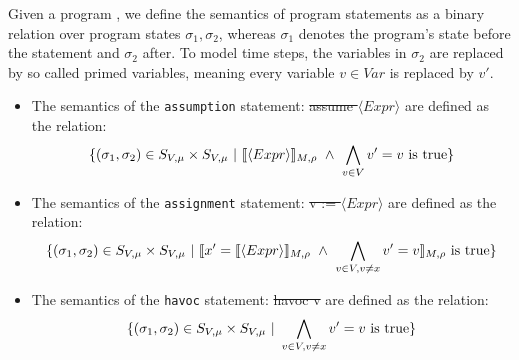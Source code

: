 \begin{mydef}
		Given a program \prg, we define the semantics of program statements as a binary relation over program states $\sigma_1, \sigma_2$, whereas $\sigma_1$ denotes the program's state before the statement and $\sigma_2$ after. To model time steps, the variables in $\sigma_2$ are replaced by so called primed variables, meaning every variable $v \in Var$ is replaced by $v'$. \\
	\begin{itemize}
		\item The semantics of the \textnormal{\texttt{assumption}} statement: \textnormal{\st{assume $\langle Expr \rangle$}} are defined as the relation: \\
		\begin{equation*}
			\{(\sigma_1, \sigma_2) \in \stateSpace \times \stateSpace\ |\ \eval{\langle Expr \rangle}\ \land\ \bigwedge\limits_{v \in V} v' = v  \text{ is true}\}
		\end{equation*}
		\item The semantics of the \textnormal{\texttt{assignment}} statement: \textnormal{\st{v := $\langle Expr \rangle$}} are defined as the relation: \\
		\begin{equation*}
			 \{(\sigma_1, \sigma_2) \in \stateSpace \times \stateSpace\ |\ \eval{x' = \eval{\langle Expr\rangle}\ \land\ \bigwedge\limits_{v \in V, v \not= x} v' = v 
			} \text{ is true}\}
		\end{equation*}
		\item The semantics of the \textnormal{\texttt{havoc}} statement: \textnormal{\st{havoc v}} are defined as the relation: \\
		\begin{equation*}
			\{(\sigma_1, \sigma_2) \in S_{V, \mu} \times S_{V, \mu}\ |\ \bigwedge\limits_{v 	\in V, v \not= x} v' = v 
			\text{ is true} \}
		\end{equation*}
	\end{itemize}
\end{mydef}


